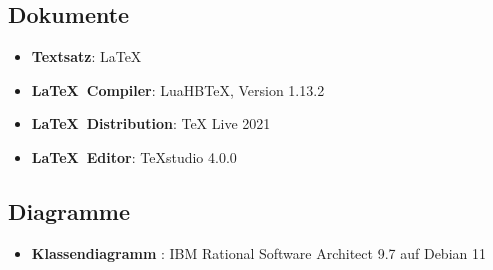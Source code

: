 \subsection{Dokumente}
\begin{itemize}
	\item \textbf{Textsatz}: \LaTeX {}
	\item \textbf{\LaTeX\ Compiler}: LuaHBTeX, Version 1.13.2
	\item \textbf{\LaTeX\ Distribution}: TeX Live 2021
	\item \textbf{\LaTeX\ Editor}: TeXstudio 4.0.0
\end{itemize}
\subsection{Diagramme}
\begin{itemize}
	\item \textbf{Klassendiagramm }: IBM Rational Software Architect 9.7 auf Debian 11
\end{itemize}